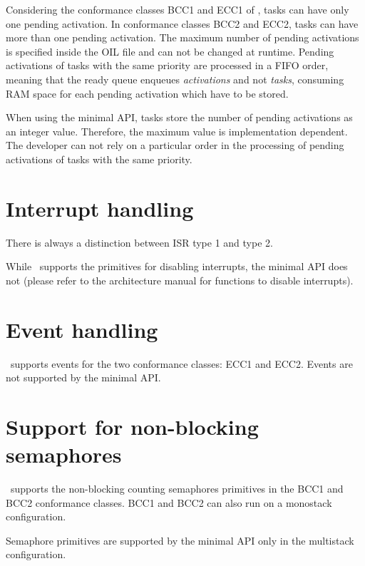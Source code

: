 \documentclass[12pt,a4paper,normalheadings,titlepage]{scrreprt}
\begin{document}
Considering the conformance classes BCC1 and ECC1 of \ee, tasks can
have only one pending activation. In conformance classes BCC2 and
ECC2, tasks can have more than one pending activation. The maximum
number of pending activations is specified inside the OIL file and
can not be changed at runtime. Pending activations of tasks with the
same priority are processed in a FIFO order, meaning that the ready
queue enqueues {\em activations} and not {\em tasks}, consuming RAM
space for each pending activation which have to be stored.

When using the minimal API, tasks store the number of pending activations as an integer value. 
Therefore, the maximum value is implementation dependent. The developer 
can not rely on a particular order in the processing of pending 
activations of tasks with the same priority. 


\section{Interrupt handling}

There is always a distinction between ISR type 1 and type 2.

While \ee\ supports the primitives for disabling interrupts, the
minimal API does not (please refer to the architecture manual for
functions to disable interrupts).


\section{Event handling}

\ee\ supports events for the two conformance classes: ECC1 and ECC2. 
Events are not supported by the minimal API.


\section{Support for non-blocking semaphores}

\ee\ supports the non-blocking counting semaphores primitives in the
BCC1 and BCC2 conformance classes. BCC1 and BCC2 can also run on a
monostack configuration.

Semaphore primitives are supported by the minimal API only in the multistack
configuration.
\end{document}
